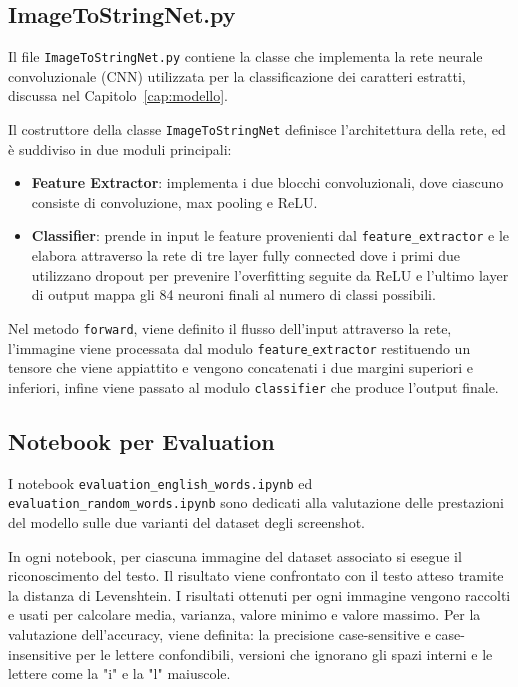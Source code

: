\subsection{ImageToStringNet.py}
Il file \texttt{ImageToStringNet.py} contiene la classe che implementa la rete neurale convoluzionale (CNN) utilizzata per la classificazione dei caratteri estratti, discussa nel Capitolo~\ref{cap:modello}. 

Il costruttore della classe \texttt{ImageToStringNet} definisce l'architettura della rete, ed è suddiviso in due moduli principali:
\begin{itemize}
    \item \textbf{Feature Extractor}: implementa i due blocchi convoluzionali, dove ciascuno consiste di convoluzione, max pooling e ReLU.
    \item \textbf{Classifier}: prende in input le feature provenienti dal \texttt{feature\_extractor} e le elabora attraverso la rete di tre layer fully connected dove i primi due utilizzano dropout per prevenire l'overfitting seguite da ReLU e l'ultimo layer di output mappa gli 84 neuroni finali al numero di classi possibili.
\end{itemize}

Nel metodo \texttt{forward}, viene definito il flusso dell'input attraverso la rete, l'immagine viene processata dal modulo \texttt{feature$\_$extractor} restituendo un tensore che viene appiattito e vengono concatenati i due margini superiori e inferiori, infine viene passato al modulo \texttt{classifier} che produce l'output finale.

\subsection{Notebook per Evaluation}
I notebook \texttt{evaluation\_english\_words.ipynb} ed \\  \texttt{evaluation\_random\_words.ipynb} sono dedicati alla valutazione delle prestazioni del modello sulle due varianti del dataset degli screenshot. 

In ogni notebook, per ciascuna immagine del dataset associato si esegue il riconoscimento del testo. Il risultato viene confrontato con il testo atteso tramite la distanza di Levenshtein. I risultati ottenuti per ogni immagine vengono raccolti e usati per calcolare media, varianza, valore minimo e valore massimo. Per la valutazione dell'accuracy, viene definita: la precisione case-sensitive e case-insensitive per le lettere confondibili, versioni che ignorano gli spazi interni e le lettere come la "i" e la "l" maiuscole.


